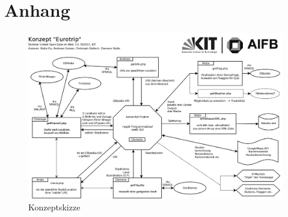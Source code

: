 \documentclass[a4paper, 11pt]{article}
\begin{document}
\section{Anhang}
\begin{figure}[H]
  	\hspace{20pt}
	\centering
	\includegraphics[width=1.7\columnwidth, angle=90]{seminarLOD.png}
	\caption{Konzeptskizze}
	\label{pic:Pakete}
\end{figure}
\end{document}
